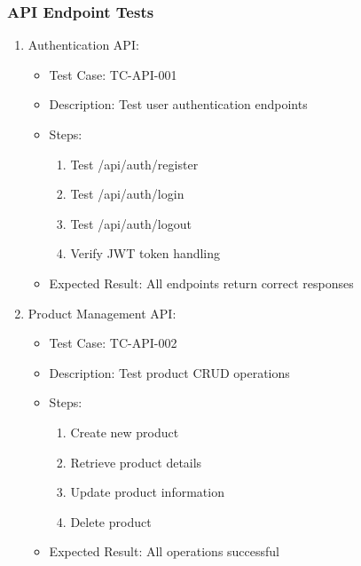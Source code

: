 \subsubsection{API Endpoint Tests}
\begin{enumerate}
    \item Authentication API:
    \begin{itemize}
        \item Test Case: TC-API-001
        \item Description: Test user authentication endpoints
        \item Steps:
        \begin{enumerate}
            \item Test /api/auth/register
            \item Test /api/auth/login
            \item Test /api/auth/logout
            \item Verify JWT token handling
        \end{enumerate}
        \item Expected Result: All endpoints return correct responses
    \end{itemize}

    \item Product Management API:
    \begin{itemize}
        \item Test Case: TC-API-002
        \item Description: Test product CRUD operations
        \item Steps:
        \begin{enumerate}
            \item Create new product
            \item Retrieve product details
            \item Update product information
            \item Delete product
        \end{enumerate}
        \item Expected Result: All operations successful
    \end{itemize}
\end{enumerate}

